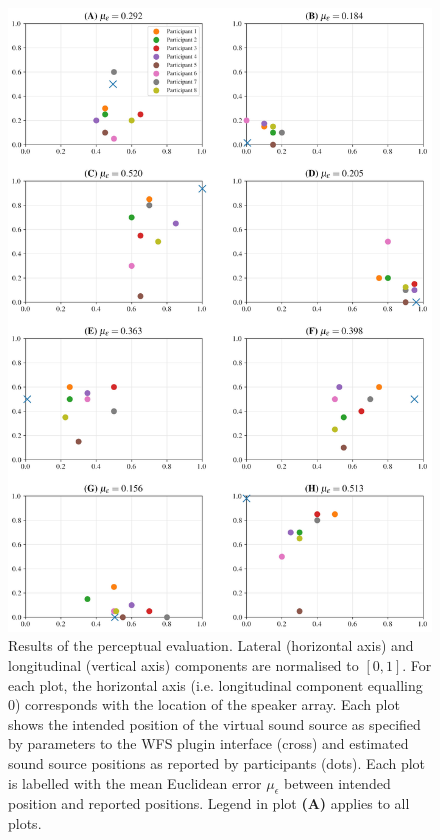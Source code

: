 \begin{figure}[h!]
    \centering
    \includegraphics[width=.775\textwidth]{figures/subjective}
    \caption{
        Results of the perceptual evaluation.
        Lateral (horizontal axis) and longitudinal (vertical axis) components
        are normalised to $[0, 1]$.
        For each plot, the horizontal axis (i.e. longitudinal component
        equalling 0) corresponds with the location of the speaker array.
        Each plot shows the intended position of the virtual sound source as
        specified by parameters to the WFS plugin interface (cross) and
        estimated sound source positions as reported by participants (dots).
        Each plot is labelled with the mean Euclidean error $\mu_\epsilon$
        between intended position and reported positions.
        Legend in plot \textbf{(A)} applies to all plots.
    }
    \label{fig:perceptual}
\end{figure}

